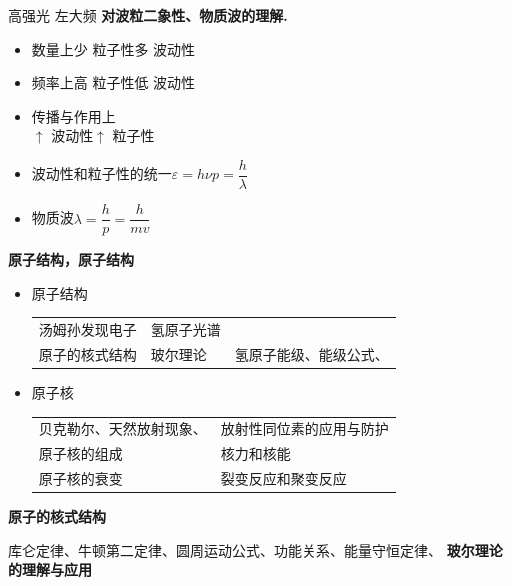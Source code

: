\noindent 高强光 左大频 %
\textbf{对波粒二象性、物质波的理解.}
\begin{itemize}
\item 数量上\quad 少 粒子性\quad 多 波动性
\item 频率上\quad 高 粒子性\quad 低 波动性
\item 传播与作用上\\
  $\uparrow$ 波动性\quad $\uparrow$ 粒子性 %
\item 波动性和粒子性的统一\quad $\varepsilon=h\nu$\quad $p=\dfrac{h}{\lambda}$
\item 物质波\quad $\lambda=\dfrac{h}{p}=\dfrac{h}{mv}$
\end{itemize}
\textbf{原子结构，原子结构} %
\begin{itemize}
\item 原子结构\\
  \begin{tabular}[t]{@{}lll@{}}
  汤姆孙发现电子 & 氢原子光谱 & \\
  原子的核式结构 & 玻尔理论 & 氢原子能级、能级公式、 \\
  \end{tabular}
\item 原子核\\
  \begin{tabular}[t]{@{}ll@{}}
  贝克勒尔、天然放射现象、 & 放射性同位素的应用与防护 \\
  原子核的组成 & 核力和核能 \\
  原子核的衰变 & 裂变反应和聚变反应 \\
  \end{tabular}
\end{itemize}
\textbf{原子的核式结构}

库仑定律、牛顿第二定律、圆周运动公式、功能关系、能量守恒定律、
\textbf{玻尔理论的理解与应用}

